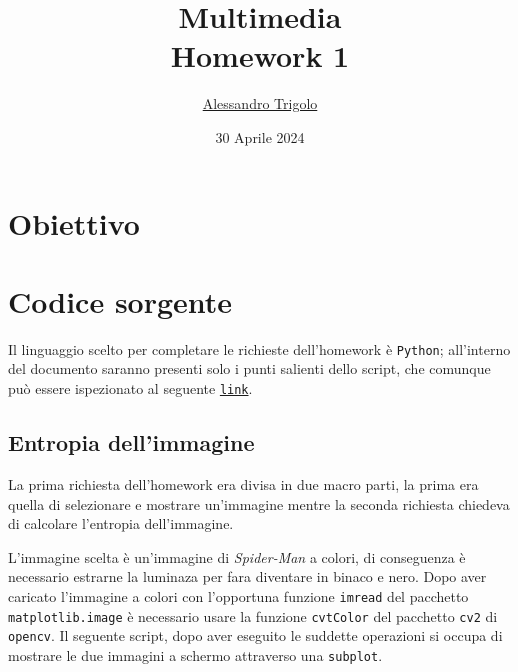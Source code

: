 \title{\vspace{160px} \textbf{\huge{Multimedia}} \\\vspace{17.5px} \LARGE{Homework 1}  \vspace{10px}}
\author{\href{https://github.com/imAlessas}{Alessandro Trigolo}}
\date{30 Aprile 2024}



\maketitle\newpage

\tableofcontents\newpage

\listoftodos\newpage


\section{Obiettivo}



\vspace{30px}\section{Codice sorgente}
Il linguaggio scelto per completare le richieste dell'homework è \texttt{Python}; all'interno del documento saranno presenti solo i punti salienti dello script, che comunque può essere ispezionato al seguente \href{https://github.com/imAlessas/computer-networks/blob/main/multimedia/hw-1/script/lossless_coding.py}{\texttt{link}}.



\vspace{15px}\subsection{Entropia dell'immagine}

La prima richiesta dell'homework era divisa in due macro parti, la prima era quella di selezionare e mostrare un'immagine mentre la seconda richiesta chiedeva di calcolare l'entropia dell'immagine.

L'immagine scelta è un'immagine di \textsl{Spider-Man} a colori, di conseguenza è necessario estrarne la luminaza per fara diventare in binaco e nero. Dopo aver caricato l'immagine a colori con l'opportuna funzione \texttt{imread} del pacchetto \texttt{matplotlib.image} è necessario usare la funzione \texttt{cvtColor} del pacchetto \texttt{cv2} di \texttt{opencv}. Il seguente script, dopo aver eseguito le suddette operazioni si occupa di mostrare le due immagini a schermo attraverso una \texttt{subplot}.

